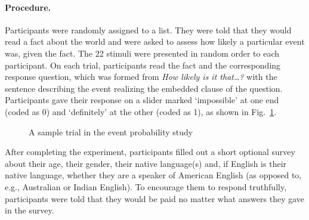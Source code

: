 \documentclass[11pt,fleqn]{article}
\newcommand{\6}{\mbox{$[\hspace*{-.6mm}[$}}
\newcommand{\9}{\mbox{$]\hspace*{-.6mm}]$}}
\newcommand{\figref}[1]{Fig.~\ref{#1}}
\begin{document}
\paragraph{Procedure.} Participants were randomly assigned to a list. They were told that they would read a fact about the world and were asked to assess how likely a particular event was, given the fact. The 22 stimuli were presented in random order to each participant. On each trial, participants read the fact and the corresponding response question, which was formed from {\em How likely is it that\ldots ?} with the sentence describing the event realizing the embedded clause of the question. Participants gave their response on a slider marked `impossible' at one end (coded as 0) and `definitely' at the other (coded as 1), as shown in \figref{f-trial-exp1}. 

\begin{figure}[h!]
\begin{center}
\end{center}
\caption{A sample trial in the event probability study}\label{f-trial-exp1}
\end{figure}

After completing the experiment, participants filled out a short optional survey about their age, their gender, their native language(s) and, if English is their native language, whether they are a speaker of American English (as opposed to, e.g., Australian or Indian English). To encourage them to respond truthfully, participants were told that they would be paid no matter what answers they gave in the survey. 
\end{document}
